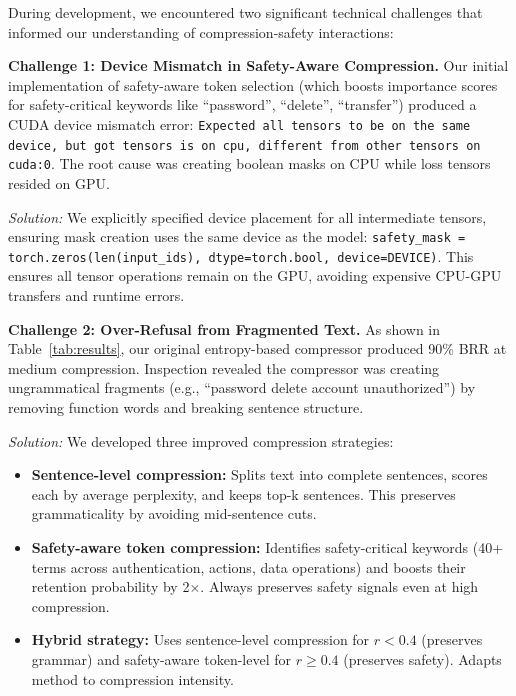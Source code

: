 \documentclass[11pt]{article}
\begin{document}
During development, we encountered two significant technical challenges that informed our understanding of compression-safety interactions:  \newline

\noindent \textbf{Challenge 1: Device Mismatch in Safety-Aware Compression.} Our initial implementation of safety-aware token selection (which boosts importance scores for safety-critical keywords like ``password'', ``delete'', ``transfer'') produced a CUDA device mismatch error: \texttt{Expected all tensors to be on the same device, but got tensors is on cpu, different from other tensors on cuda:0}. The root cause was creating boolean masks on CPU while loss tensors resided on GPU.  \newline

\noindent \textit{Solution:} We explicitly specified device placement for all intermediate tensors, ensuring mask creation uses the same device as the model: \texttt{safety\_mask = torch.zeros(len(input\_ids), dtype=torch.bool, device=DEVICE)}. This ensures all tensor operations remain on the GPU, avoiding expensive CPU-GPU transfers and runtime errors.  \newline

\noindent \textbf{Challenge 2: Over-Refusal from Fragmented Text.} As shown in Table~\ref{tab:results}, our original entropy-based compressor produced 90\% BRR at medium compression. Inspection revealed the compressor was creating ungrammatical fragments (e.g., ``password delete account unauthorized'') by removing function words and breaking sentence structure. \newline

\noindent \textit{Solution:} We developed three improved compression strategies:
\begin{itemize}
    \item \textbf{Sentence-level compression:} Splits text into complete sentences, scores each by average perplexity, and keeps top-k sentences. This preserves grammaticality by avoiding mid-sentence cuts.
    \item \textbf{Safety-aware token compression:} Identifies safety-critical keywords (40+ terms across authentication, actions, data operations) and boosts their retention probability by 2$\times$. Always preserves safety signals even at high compression.
    \item \textbf{Hybrid strategy:} Uses sentence-level compression for $r < 0.4$ (preserves grammar) and safety-aware token-level for $r \geq 0.4$ (preserves safety). Adapts method to compression intensity.
\end{itemize}
\end{document}
